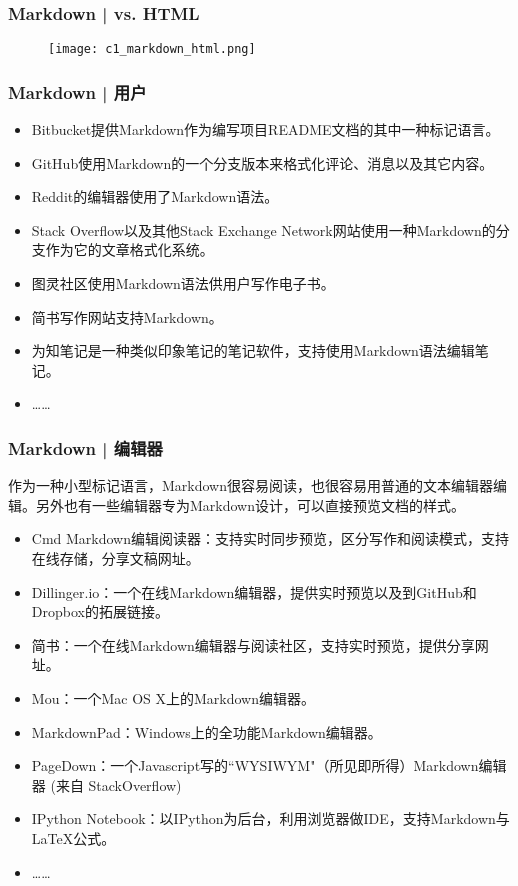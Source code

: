 \begin{frame}
  \frametitle{Markdown | vs. HTML}
  \begin{figure}
    \centering
    \texttt{[image: c1\_markdown\_html.png]}
  \end{figure}
\end{frame}

\begin{frame}
  \frametitle{Markdown | 用户}
  \begin{itemize}
    \item Bitbucket提供Markdown作为编写项目README文档的其中一种标记语言。
    \item GitHub使用Markdown的一个分支版本来格式化评论、消息以及其它内容。
    \item Reddit的编辑器使用了Markdown语法。
    \item Stack Overflow以及其他Stack Exchange Network网站使用一种Markdown的分支作为它的文章格式化系统。
    \item 图灵社区使用Markdown语法供用户写作电子书。
    \item 简书写作网站支持Markdown。
    \item 为知笔记是一种类似印象笔记的笔记软件，支持使用Markdown语法编辑笔记。
    \item ……
  \end{itemize}
\end{frame}

\begin{frame}
  \frametitle{Markdown | 编辑器}
作为一种小型标记语言，Markdown很容易阅读，也很容易用普通的文本编辑器编辑。另外也有一些编辑器专为Markdown设计，可以直接预览文档的样式。
  \begin{itemize}
    \item Cmd Markdown编辑阅读器：支持实时同步预览，区分写作和阅读模式，支持在线存储，分享文稿网址。
    \item Dillinger.io：一个在线Markdown编辑器，提供实时预览以及到GitHub和Dropbox的拓展链接。
    \item 简书：一个在线Markdown编辑器与阅读社区，支持实时预览，提供分享网址。
    \item Mou：一个Mac OS X上的Markdown编辑器。
    \item MarkdownPad：Windows上的全功能Markdown编辑器。
    \item PageDown：一个Javascript写的``WYSIWYM"（所见即所得）Markdown编辑器 (来自 StackOverflow)
    \item IPython Notebook：以IPython为后台，利用浏览器做IDE，支持Markdown与\LaTeX 公式。
    \item ……
  \end{itemize}
\end{frame}

